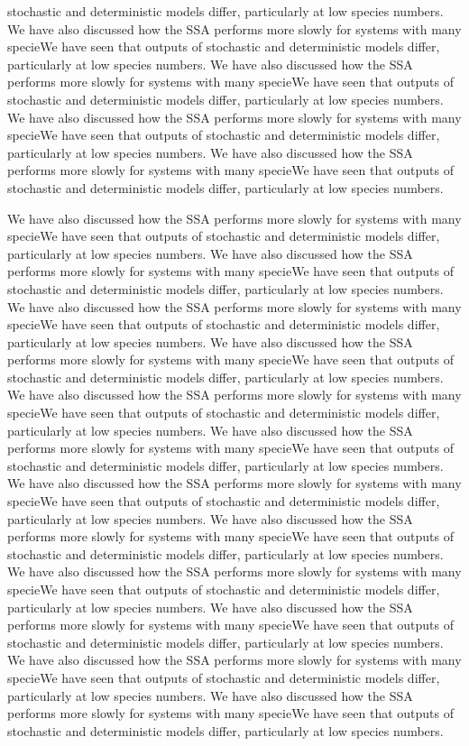 \documentclass[11pt]{article}
\begin{document}
\begin{multicols}{2}
stochastic and deterministic models differ, particularly at low
species numbers. We have also discussed how the SSA performs more
slowly for systems with many specieWe have seen that outputs of
stochastic and deterministic models differ, particularly at low
species numbers. We have also discussed how the SSA performs more
slowly for systems with many specieWe have seen that outputs of
stochastic and deterministic models differ, particularly at low
species numbers. We have also discussed how the SSA performs more
slowly for systems with many specieWe have seen that outputs of
stochastic and deterministic models differ, particularly at low
species numbers. We have also discussed how the SSA performs more
slowly for systems with many specieWe have seen that outputs of
stochastic and deterministic models differ, particularly at low
species numbers.
\end{multicols}
 We have also discussed how the SSA performs more slowly for systems with many specieWe have seen that outputs of stochastic and deterministic models differ, particularly at low species numbers. We have also discussed how the SSA performs more slowly for systems with many specieWe have seen that outputs of stochastic and deterministic models differ, particularly at low species numbers. We have also discussed how the SSA performs more slowly for systems with many specieWe have seen that outputs of stochastic and deterministic models differ, particularly at low species numbers. We have also discussed how the SSA performs more slowly for systems with many specieWe have seen that outputs of stochastic and deterministic models differ, particularly at low species numbers. We have also discussed how the SSA performs more slowly for systems with many specieWe have seen that outputs of stochastic and deterministic models differ, particularly at low species numbers. We have also discussed how the SSA performs more slowly for systems with many specieWe have seen that outputs of stochastic and deterministic models differ, particularly at low species numbers. We have also discussed how the SSA performs more slowly for systems with many specieWe have seen that outputs of stochastic and deterministic models differ, particularly at low species numbers. We have also discussed how the SSA performs more slowly for systems with many specieWe have seen that outputs of stochastic and deterministic models differ, particularly at low species numbers. We have also discussed how the SSA performs more slowly for systems with many specieWe have seen that outputs of stochastic and deterministic models differ, particularly at low species numbers. We have also discussed how the SSA performs more slowly for systems with many specieWe have seen that outputs of stochastic and deterministic models differ, particularly at low species numbers. We have also discussed how the SSA performs more slowly for systems with many specieWe have seen that outputs of stochastic and deterministic models differ, particularly at low species numbers. We have also discussed how the SSA performs more slowly for systems with many specieWe have seen that outputs of stochastic and deterministic models differ, particularly at low species numbers.
\end{document}
